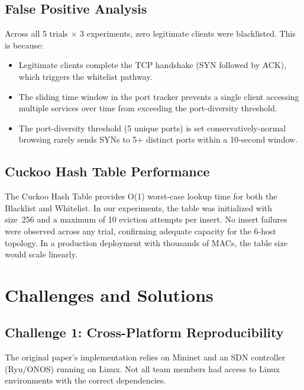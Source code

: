 \documentclass[12pt, a4paper]{article}
\begin{document}
\subsection{False Positive Analysis}

Across all 5 trials $\times$ 3 experiments, zero legitimate clients were blacklisted. This is because:

\begin{itemize}[itemsep=3pt]
    \item Legitimate clients complete the TCP handshake (SYN followed by ACK), which triggers the whitelist pathway.
    \item The sliding time window in the port tracker prevents a single client accessing multiple services over time from exceeding the port-diversity threshold.
    \item The port-diversity threshold (5 unique ports) is set conservatively-normal browsing rarely sends SYNs to 5+ distinct ports within a 10-second window.
\end{itemize}

\subsection{Cuckoo Hash Table Performance}

The Cuckoo Hash Table provides O(1) worst-case lookup time for both the Blacklist and Whitelist. In our experiments, the table was initialized with size~256 and a maximum of 10 eviction attempts per insert. No insert failures were observed across any trial, confirming adequate capacity for the 6-host topology. In a production deployment with thousands of MACs, the table size would scale linearly.

\newpage

\section{Challenges and Solutions}

\subsection{Challenge 1: Cross-Platform Reproducibility}

The original paper's implementation relies on Mininet and an SDN controller (Ryu/ONOS) running on Linux. Not all team members had access to Linux environments with the correct dependencies.
\end{document}
